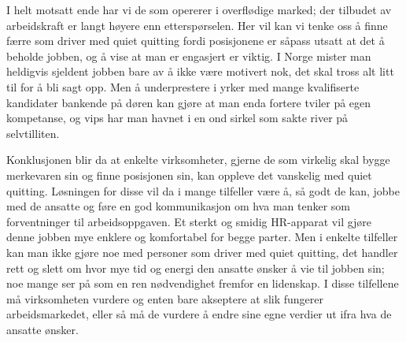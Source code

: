 \documentclass[a4paper, 12pt]{article}  %
\begin{document}
I helt motsatt ende har vi de som opererer i overflødige marked; der tilbudet av arbeidskraft er langt høyere enn etterspørselen. 
Her vil kan vi tenke oss å finne færre som driver med quiet quitting fordi posisjonene er såpass utsatt at det å beholde jobben, og å vise at man er engasjert er viktig.
I Norge mister man heldigvis sjeldent jobben bare av å ikke være motivert nok, det skal tross alt litt til for å bli sagt opp. 
Men å underprestere i yrker med mange kvalifiserte kandidater bankende på døren kan gjøre at man enda fortere tviler på egen kompetanse, og vips har man havnet i en ond sirkel som sakte river på selvtilliten.

Konklusjonen blir da at enkelte virksomheter, gjerne de som virkelig skal bygge merkevaren sin og finne posisjonen sin, kan oppleve det vanskelig med quiet quitting.
Løsningen for disse vil da i mange tilfeller være å, så godt de kan, jobbe med de ansatte og føre en god kommunikasjon om hva man tenker som forventninger til arbeidsoppgaven.
Et sterkt og smidig HR-apparat vil gjøre denne jobben mye enklere og komfortabel for begge parter.
Men i enkelte tilfeller kan man ikke gjøre noe med personer som driver med quiet quitting, det handler rett og slett om hvor mye tid og energi den ansatte ønsker å vie til jobben sin;
noe mange ser på som en ren nødvendighet fremfor en lidenskap.
I disse tilfellene må virksomheten vurdere og enten bare akseptere at slik fungerer arbeidsmarkedet, eller så må de vurdere å endre sine egne verdier ut ifra hva de ansatte ønsker.

\newpage
\printbibliography[heading=bibintoc] %
\end{document}
